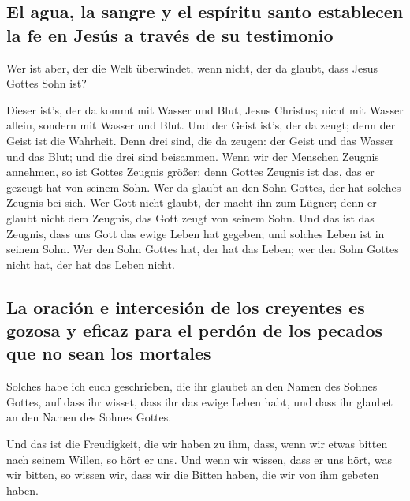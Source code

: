 \hypertarget{el-agua-la-sangre-y-el-espuxedritu-santo-establecen-la-fe-en-jesuxfas-a-travuxe9s-de-su-testimonio}{%
\subsection{El agua, la sangre y el espíritu santo establecen la fe en
Jesús a través de su
testimonio}\label{el-agua-la-sangre-y-el-espuxedritu-santo-establecen-la-fe-en-jesuxfas-a-travuxe9s-de-su-testimonio}}

 Wer ist aber, der die Welt überwindet, wenn nicht, der da
glaubt, dass Jesus Gottes Sohn ist?

 Dieser ist's, der da kommt mit Wasser und Blut, Jesus
Christus; nicht mit Wasser allein, sondern mit Wasser und Blut. Und der
Geist ist's, der da zeugt; denn der Geist ist die Wahrheit.
 Denn drei sind, die da zeugen: der Geist und das Wasser
und das Blut;  und die drei sind beisammen. 
Wenn wir der Menschen Zeugnis annehmen, so ist Gottes Zeugnis größer;
denn Gottes Zeugnis ist das, das er gezeugt hat von seinem Sohn.
 Wer da glaubt an den Sohn Gottes, der hat solches
Zeugnis bei sich. Wer Gott nicht glaubt, der macht ihn zum Lügner; denn
er glaubt nicht dem Zeugnis, das Gott zeugt von seinem Sohn.
 Und das ist das Zeugnis, dass uns Gott das ewige Leben
hat gegeben; und solches Leben ist in seinem Sohn.  Wer
den Sohn Gottes hat, der hat das Leben; wer den Sohn Gottes nicht hat,
der hat das Leben nicht.

\hypertarget{la-oraciuxf3n-e-intercesiuxf3n-de-los-creyentes-es-gozosa-y-eficaz-para-el-perduxf3n-de-los-pecados-que-no-sean-los-mortales}{%
\subsection{La oración e intercesión de los creyentes es gozosa y eficaz
para el perdón de los pecados que no sean los
mortales}\label{la-oraciuxf3n-e-intercesiuxf3n-de-los-creyentes-es-gozosa-y-eficaz-para-el-perduxf3n-de-los-pecados-que-no-sean-los-mortales}}

 Solches habe ich euch geschrieben, die ihr glaubet an
den Namen des Sohnes Gottes, auf dass ihr wisset, dass ihr das ewige
Leben habt, und dass ihr glaubet an den Namen des Sohnes Gottes.

 Und das ist die Freudigkeit, die wir haben zu ihm, dass,
wenn wir etwas bitten nach seinem Willen, so hört er uns.
 Und wenn wir wissen, dass er uns hört, was wir bitten,
so wissen wir, dass wir die Bitten haben, die wir von ihm gebeten haben.

